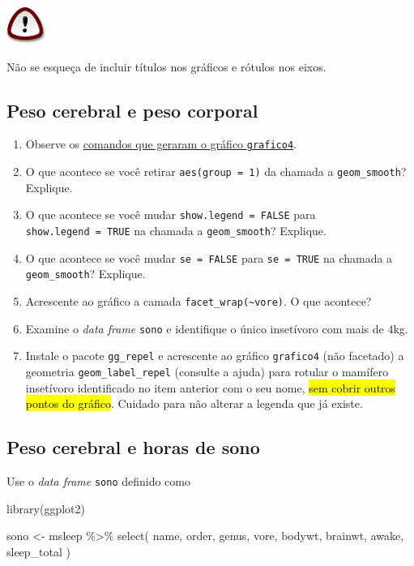 \documentclass[
  11pt]{report}
\newenvironment{Shaded}{\begin{snugshade}}{\end{snugshade}}
\newcommand{\FunctionTok}[1]{\textcolor[rgb]{0.00,0.00,0.00}{#1}}
\newcommand{\NormalTok}[1]{#1}
\newcommand{\OtherTok}[1]{\textcolor[rgb]{0.56,0.35,0.01}{#1}}
\newcommand{\SpecialCharTok}[1]{\textcolor[rgb]{0.00,0.00,0.00}{#1}}
\newenvironment{rmdimportant}
{
  \begin{myimportant}
    \includegraphics{images/important.png}
    \tcblower
  }
  {
  \end{myimportant}
}
\renewenvironment{Shaded}{
  \begin{mdframed}[%
    roundcorner=2pt,%
    innerleftmargin=5pt,%
    innerrightmargin=5pt,%
    topline=true,%
    leftline=true,%
    rightline=true,%
    bottomline=true,%
    linewidth=0.5pt,%
    linecolor=black!20,%
    backgroundcolor=black!2,%
    skipabove=2ex,%
    skipbelow=2.5ex%
  ]%
}
{
  \end{mdframed}
}
\begin{document}
\begin{rmdimportant}
Não se esqueça de incluir títulos nos gráficos e rótulos nos eixos.

\end{rmdimportant}

\hypertarget{peso-cerebral-e-peso-corporal}{%
\subsection{Peso cerebral e peso corporal}\label{peso-cerebral-e-peso-corporal}}

\begin{enumerate}
\def\labelenumi{\arabic{enumi}.}
\item
  Observe os \protect\hyperlink{grafico4}{comandos que geraram o gráfico \texttt{grafico4}}.
\item
  O que acontece se você retirar \texttt{aes(group\ =\ 1)} da chamada a \texttt{geom\_smooth}? Explique.
\item
  O que acontece se você mudar \texttt{show.legend\ =\ FALSE} para \texttt{show.legend\ =\ TRUE} na chamada a \texttt{geom\_smooth}? Explique.
\item
  O que acontece se você mudar \texttt{se\ =\ FALSE} para \texttt{se\ =\ TRUE} na chamada a \texttt{geom\_smooth}? Explique.
\item
  Acrescente ao gráfico a camada \texttt{facet\_wrap(\textasciitilde{}vore)}. O que acontece?
\item
  Examine o \emph{data frame} \texttt{sono} e identifique o único insetívoro com mais de $4$kg.
\item
  Instale o pacote \texttt{gg\_repel} e acrescente ao gráfico \texttt{grafico4} (não facetado) a geometria \texttt{geom\_label\_repel} (consulte a ajuda) para rotular o mamífero insetívoro identificado no item anterior com o seu nome, {\hl{sem cobrir outros pontos do gráfico}}. Cuidado para não alterar a legenda que já existe.
\end{enumerate}

\hypertarget{peso-cerebral-e-horas-de-sono}{%
\subsection{Peso cerebral e horas de sono}\label{peso-cerebral-e-horas-de-sono}}

\begin{rmdbox}

Use o \emph{data frame} \texttt{sono} definido como

\begin{Shaded}
\begin{Highlighting}[]
\FunctionTok{library}\NormalTok{(ggplot2)}

\NormalTok{sono }\OtherTok{\textless{}{-}}\NormalTok{ msleep }\SpecialCharTok{\%\textgreater{}\%} 
  \FunctionTok{select}\NormalTok{(}
\NormalTok{    name, order, genus, vore, bodywt, }
\NormalTok{    brainwt, awake, sleep\_total}
\NormalTok{  )}
\end{Highlighting}
\end{Shaded}

\end{rmdbox}
\end{document}
